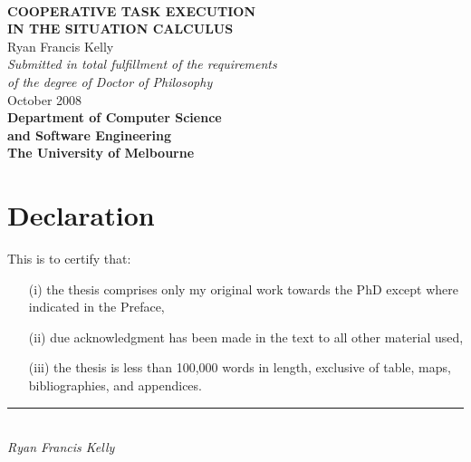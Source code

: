 %
%
%
%





\begin{titlepage}
\begin{center}
\ \\
\vspace{3cm}
{\bf\LARGE  COOPERATIVE TASK EXECUTION }\\ \vspace{0.5cm} %
{\bf\LARGE  IN THE SITUATION CALCULUS } \\ %
\vspace{2cm}
{\LARGE      Ryan Francis Kelly       }\\
\vspace{5cm}
{\em\large Submitted in total fulfillment of the requirements}\\ \vspace{0.1cm}
{\em\large        of the degree of Doctor of Philosophy     }\\
\vspace{0.5cm}
{\Large             October 2008        }\\
\vspace{2.5cm}
{\bf\large Department of Computer Science\\ and Software Engineering}\\ \vspace{0.5cm}
{\bf\Large        The University of Melbourne     }\\
\vspace{0.5cm}
\end{center}
\end{titlepage}
\cleardoublepage     %





\chapter*{Declaration}
This is to certify that:
\begin{itemize}
\item[(i)] the thesis comprises only my original work towards the PhD except where indicated in the Preface,
\item[(ii)] due acknowledgment has been made in the text to all other material used,
\item[(iii)] the thesis is less than 100,000 words in length, exclusive of table, maps, bibliographies, and appendices.
\end{itemize}
\vspace{3cm}
\rule{70mm}{0.1mm}\\
\emph{Ryan Francis Kelly}


